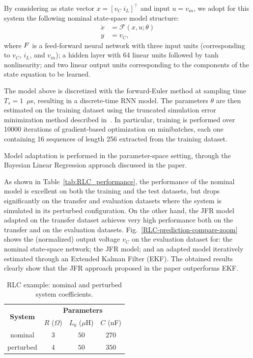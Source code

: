\documentclass{article}
\newcommand{\F}{\mathcal{F}}
\begin{document}
By considering as state vector $x = [v_C\; i_L]^\top$ and input $u=v_{in}$, we adopt for this system the following nominal state-space model structure:
\begin{align*}
\dot x & = \mathcal{F}(x, u; \theta) \\
 y &= v_{C},
\end{align*}
where $\mathcal \F$ is a feed-forward neural network with three input units (corresponding to $v_C$, $i_L$, and $v_{in}$); a hidden layer with 64 linear units followed by tanh nonlinearity; and two linear output units corresponding to the components of the state equation to be learned. 

The model above is discretized with the forward-Euler method at sampling time $T_s = 1$~$\mu$s, resulting in a 
discrete-time RNN model. The parameters $\theta$ are then estimated on the training dataset using the  {truncated simulation error minimization} method described in~\cite{forgione2021continuous}. 
In particular, training is performed over 10000 iterations of gradient-based optimization on minibatches, each one containing
16 sequences of length 256 extracted from the training dataset. 

Model adaptation is performed in the parameter-space setting, through  the Bayesian Linear Regression approach discussed in the paper. 

As shown in Table~\ref{tab:RLC_performance}, the performance of the nominal model is excellent on both
the training and the test datasets,  but drops significantly on the transfer and evaluation datasets where the system is simulated in its perturbed configuration. On the other hand, the JFR model adapted on the transfer dataset achieves very high performance both on the transfer and on the evaluation datasets. Fig.~\ref{RLC-prediction-compare-zoom} shows the (normalized) output voltage $v_C$ on the evaluation dataset for: the nominal state-space network; the JFR model; and an adapted model iteratively estimated through an Extended Kalman Filter (EKF). The obtained results clearly show that the JFR approach proposed in the paper outperforms EKF. 
 

\begin{table}[!tb]
\centering
\caption{RLC example: nominal and perturbed system coefficients.}
\begin{tabular}{c | c  c  c}
\multirow{2}{*}{\textbf{System}} & \multicolumn{3}{c}{\textbf{Parameters}} \\
                & $R$ ($\Omega$)     & $L_0$ ($\mu$H)     & $C$ (nF)     \\ %
\hline
nominal         & $3$  & $50$  & $270$  \\
perturbed       & $4$   & $50$ & $350$ \\
\hline
\end{tabular}
\label{tab:RLC_coefficients}
\end{table}
\end{document}

